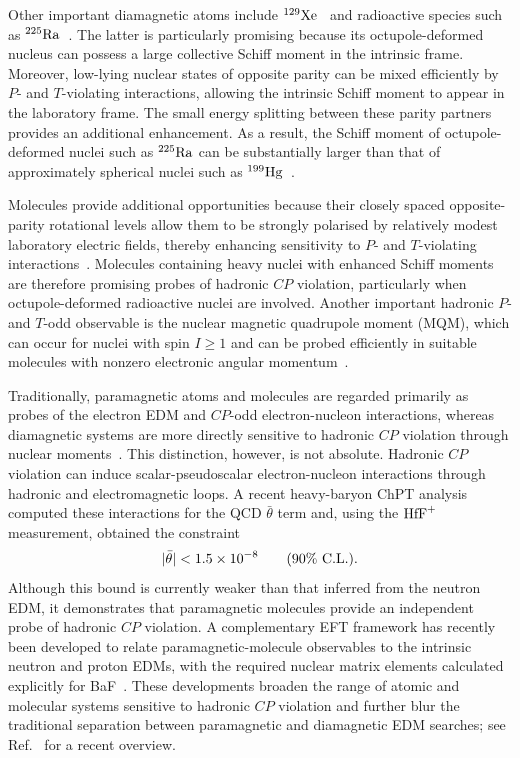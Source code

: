 \documentclass[review]{elsarticle}
\numberwithin{equation}{section}
\numberwithin{table}{section}
\numberwithin{figure}{section}
\begin{document}
Other important diamagnetic atoms include $^{129}{\rm Xe}$~\cite{Sachdeva:2019rkt,Allmendinger:2019jrk} and radioactive species such as $^{225}{\rm Ra}$~\cite{Parker:2015yka,Bishof:2016uqx}. The latter is particularly promising because its octupole-deformed nucleus can possess a large collective Schiff moment in the intrinsic frame. Moreover, low-lying nuclear states of opposite parity can be mixed efficiently by $P$- and $T$-violating interactions, allowing the intrinsic Schiff moment to appear in the laboratory frame. The small energy splitting between these parity partners provides an additional enhancement. As a result, the Schiff moment of octupole-deformed nuclei such as $^{225}{\rm Ra}$ can be substantially larger than that of approximately spherical nuclei such as $^{199}{\rm Hg}$~\cite{Engel:2013lsa,Engel:2025uci}.

Molecules provide additional opportunities because their closely spaced opposite-parity rotational levels allow them to be strongly polarised by relatively modest laboratory electric fields, thereby enhancing sensitivity to $P$- and $T$-violating interactions~\cite{Chupp:2017rkp,Safronova:2017xyt}. Molecules containing heavy nuclei with enhanced Schiff moments are therefore promising probes of hadronic $CP$ violation, particularly when octupole-deformed radioactive nuclei are involved. Another important hadronic $P$- and $T$-odd observable is the nuclear magnetic quadrupole moment (MQM), which can occur for nuclei with spin $I\geq1$ and can be probed efficiently in suitable molecules with nonzero electronic angular momentum~\cite{Chupp:2017rkp,deVries:2026quu}.

Traditionally, paramagnetic atoms and molecules are regarded primarily as probes of the electron EDM and $CP$-odd electron-nucleon interactions, whereas diamagnetic systems are more directly sensitive to hadronic $CP$ violation through nuclear moments~\cite{Chupp:2017rkp,Safronova:2017xyt}. This distinction, however, is not absolute. Hadronic $CP$ violation can induce scalar-pseudoscalar electron-nucleon interactions through hadronic and electromagnetic loops. A recent heavy-baryon ChPT analysis computed these interactions for the QCD $\bar\theta$ term and, using the ${\rm HfF}^{+}$ measurement, obtained the constraint~\cite{Mulder:2025esr}
\begin{align}
    |\bar\theta| < 1.5\times10^{-8}
    \qquad
    (90\%~{\rm C.L.}).
\end{align}
Although this bound is currently weaker than that inferred from the neutron EDM, it demonstrates that paramagnetic molecules provide an independent probe of hadronic $CP$ violation. A complementary EFT framework has recently been developed to relate paramagnetic-molecule observables to the intrinsic neutron and proton EDMs, with the required nuclear matrix elements calculated explicitly for BaF~\cite{Dekens:2025skl}. These developments broaden the range of atomic and molecular systems sensitive to hadronic $CP$ violation and further blur the traditional separation between paramagnetic and diamagnetic EDM searches; see Ref.~\cite{deVries:2026quu} for a recent overview.
\end{document}
